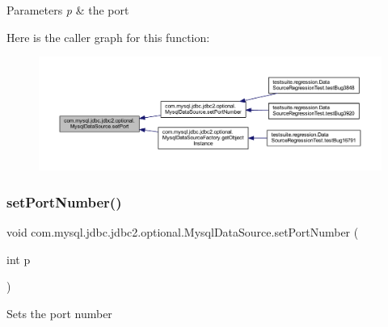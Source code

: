 \begin{DoxyParams}{Parameters}
{\em p} & the port \\
\hline
\end{DoxyParams}
Here is the caller graph for this function\+:
\nopagebreak
\begin{figure}[H]
\begin{center}
\leavevmode
\includegraphics[width=350pt]{classcom_1_1mysql_1_1jdbc_1_1jdbc2_1_1optional_1_1_mysql_data_source_aa25877765807da50745af91b24e38da0_icgraph}
\end{center}
\end{figure}
\mbox{\label{classcom_1_1mysql_1_1jdbc_1_1jdbc2_1_1optional_1_1_mysql_data_source_a18cf8b4b24e11ab5df45f4f9dc82d3aa}} 
\subsubsection{\texorpdfstring{set\+Port\+Number()}{setPortNumber()}}
{\footnotesize\ttfamily void com.\+mysql.\+jdbc.\+jdbc2.\+optional.\+Mysql\+Data\+Source.\+set\+Port\+Number (\begin{DoxyParamCaption}\item[{int}]{p }\end{DoxyParamCaption})}

Sets the port number


